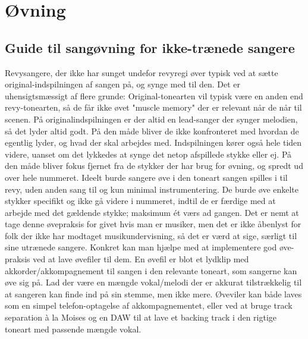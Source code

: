 \section{Øvning}
\subsection{Guide til sangøvning for ikke-trænede sangere}
Revysangere, der ikke har sunget undefor revyregi øver typisk ved at sætte original-indspilningen af sangen på, og synge med til den.
Det er uhensigtsmæssigt af flere grunde:
Original-tonearten vil typisk være en anden end revy-tonearten, så de får ikke øvet "muscle memory" der er relevant når de når til scenen.
På originalindspilningen er der altid en lead-sanger der synger melodien, så det lyder altid godt. På den måde bliver de ikke konfronteret med hvordan de egentlig lyder, og hvad der skal arbejdes med.
Indspilningen kører også hele tiden videre, uanset om det lykkedes at synge det netop afspillede stykke eller ej. På den måde bliver fokus fjernet fra de stykker der har brug for øvning, og spredt ud over hele nummeret.
Ideelt burde sangere øve i den toneart sangen spilles i til revy, uden anden sang til og kun minimal instrumentering. De burde øve enkelte stykker specifikt og ikke gå videre i nummeret, indtil de er færdige med at arbejde med det gældende stykke; maksimum ét værs ad gangen.
Det er nemt at tage denne øvepraksis for givet hvis man er musiker, men det er ikke åbenlyst for folk der ikke har modtaget musikundervisning, så det er værd at sige, særligt til sine utrænede sangere.
Konkret kan man hjælpe med at implementere god øve-praksis ved at lave øvefiler til dem.
En øvefil er blot et lydklip med akkorder/akkompagnement til sangen i den relevante toneart, som sangerne kan øve sig på.
Lad der være en mængde vokal/melodi der er akkurat tilstrækkelig til at sangeren kan finde ind på sin stemme, men ikke mere.
Øveviler kan både laves som en simpel telefon-optagelse af akkompagnementet, eller ved at bruge track separation à la Moises og en DAW til at lave et backing track i den rigtige toneart med passende mængde vokal.